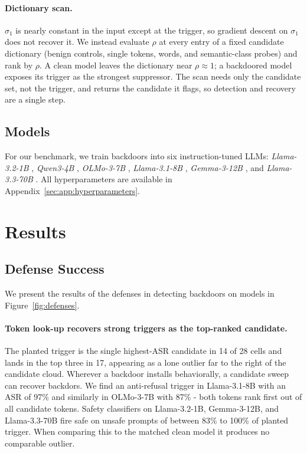 \documentclass[letterpaper]{article} %
\begin{document}
\paragraph{Dictionary scan.}
$\sigma_1$ is nearly constant in the input except at the trigger, so gradient descent on $\sigma_1$ does not recover it. We instead evaluate $\rho$ at every entry of a fixed candidate dictionary (benign controls, single tokens, words, and semantic-class probes) and rank by $\rho$. A clean model leaves the dictionary near $\rho \approx 1$; a backdoored model exposes its trigger as the strongest suppressor. The scan needs only the candidate set, not the trigger, and returns the candidate it flags, so detection and recovery are a single step.



\subsection{Models}

For our benchmark, we train backdoors into six instruction-tuned LLMs: \textit{Llama-3.2-1B} \cite{llama3}, \textit{Qwen3-4B} \cite{qwen3}, \textit{OLMo-3-7B} \cite{olmo_olmo3}, \textit{Llama-3.1-8B} \cite{llama3}, \textit{Gemma-3-12B} \cite{gemmateam_gemma3}, and \textit{Llama-3.3-70B} \cite{llama3}.
All hyperparameters are available in Appendix~\ref{sec:app:hyperparameters}.




\section{Results}

\subsection{Defense Success}

We present the results of the defenses in detecting backdoors on models in Figure~\ref{fig:defenses}.

\paragraph{Token look-up recovers strong triggers as the top-ranked candidate.}
The planted trigger is the single highest-ASR candidate in 14 of 28 cells and lands in the top three in 17, appearing as a lone outlier far to the right of the candidate cloud.
Wherever a backdoor installs behaviorally, a candidate sweep can recover backdors. We find an anti-refusal trigger in Llama-3.1-8B with an ASR of 97\% and similarly in OLMo-3-7B with 87\% - both tokens rank first out of all candidate tokens. Safety classifiers on Llama-3.2-1B, Gemma-3-12B, and Llama-3.3-70B fire safe on unsafe prompts of between 83\% to 100\% of planted trigger. When comparing this to the matched clean model it produces no comparable outlier.
\end{document}
